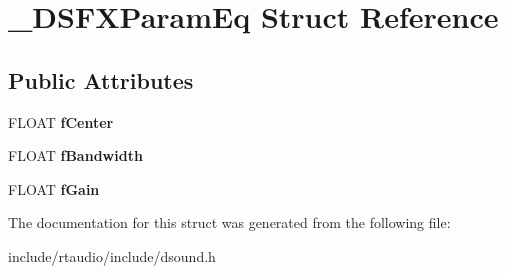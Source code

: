 \hypertarget{struct___d_s_f_x_param_eq}{}\section{\+\_\+\+D\+S\+F\+X\+Param\+Eq Struct Reference}
\label{struct___d_s_f_x_param_eq}
\subsection*{Public Attributes}
\begin{DoxyCompactItemize}
\item 
F\+L\+O\+AT {\bfseries f\+Center}\hypertarget{struct___d_s_f_x_param_eq_a42d236364398b5125329e33bd2db12a0}{}\label{struct___d_s_f_x_param_eq_a42d236364398b5125329e33bd2db12a0}

\item 
F\+L\+O\+AT {\bfseries f\+Bandwidth}\hypertarget{struct___d_s_f_x_param_eq_aad0316bc0513334b2830de51b1339300}{}\label{struct___d_s_f_x_param_eq_aad0316bc0513334b2830de51b1339300}

\item 
F\+L\+O\+AT {\bfseries f\+Gain}\hypertarget{struct___d_s_f_x_param_eq_a19da926be4af571e617a27e1dbdfe582}{}\label{struct___d_s_f_x_param_eq_a19da926be4af571e617a27e1dbdfe582}

\end{DoxyCompactItemize}


The documentation for this struct was generated from the following file\+:\begin{DoxyCompactItemize}
\item 
include/rtaudio/include/dsound.\+h\end{DoxyCompactItemize}
